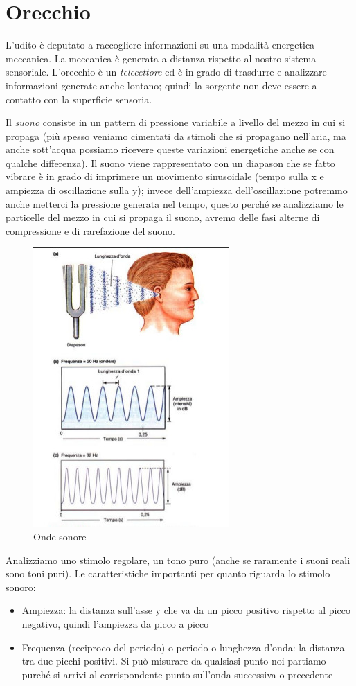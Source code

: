 \documentclass[a4paper,12pt]{article}
\begin{document}
\section{Orecchio}

L'udito è deputato a raccogliere informazioni su una modalità energetica meccanica. La meccanica è generata a distanza rispetto al nostro sistema sensoriale. L'orecchio è un \emph{telecettore} ed è in grado di trasdurre e analizzare informazioni generate anche lontano; quindi la sorgente non deve essere a contatto con la superficie sensoria.

Il \emph{suono} consiste in un pattern di pressione variabile a livello del mezzo in cui si propaga (più spesso veniamo cimentati da stimoli che si propagano nell'aria, ma anche sott'acqua possiamo ricevere queste variazioni energetiche anche se con qualche differenza). Il suono viene rappresentato con un diapason che se fatto vibrare è in grado di imprimere un movimento sinusoidale (tempo sulla x e ampiezza di oscillazione sulla y); invece dell'ampiezza dell'oscillazione potremmo anche metterci la pressione generata nel tempo, questo perché se analizziamo le particelle del mezzo in cui si propaga il suono, avremo delle fasi alterne di compressione e di rarefazione del suono. 


\begin{figure}[H]
\centering
\includegraphics[scale=0.6]{immagine/suono.jpg}
\caption{Onde sonore}
\end{figure}

Analizziamo uno stimolo regolare, un tono puro (anche se raramente i suoni reali sono toni puri). Le caratteristiche importanti per quanto riguarda lo stimolo sonoro:
\begin{itemize}
\item{Ampiezza: la distanza sull'asse y che va da un picco positivo rispetto al picco negativo, quindi l'ampiezza da picco a picco} 
\item{Frequenza (reciproco del periodo) o periodo o lunghezza d'onda: la distanza tra due picchi positivi. Si può misurare da qualsiasi punto noi partiamo purché si arrivi al corrispondente punto sull'onda successiva o precedente}
\end{itemize}
\end{document}
